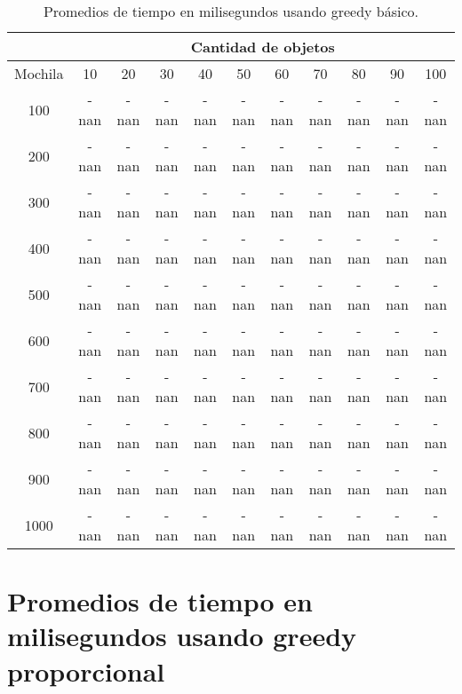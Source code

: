 \documentclass[a4paper]{article}
\begin{document}
\begin{table}[H]
\centering
\relax
\resizebox{\textwidth}{!} {%
\begin{tabular}{|c|c|c|c|c|c|c|c|c|c|c|}
\cline{2-11}
 \multicolumn{1}{c}{} & \multicolumn{10}{|c|}{\textbf{Cantidad de objetos}} \\
\hline
Mochila & 10 & 20 & 30 & 40 & 50 & 60 & 70 & 80 & 90 & 100 \\
\hline
\hline
100 & -nan & -nan & -nan & -nan & -nan & -nan & -nan & -nan & -nan & -nan \\
\hline
\hline
200 & -nan & -nan & -nan & -nan & -nan & -nan & -nan & -nan & -nan & -nan \\
\hline
\hline
300 & -nan & -nan & -nan & -nan & -nan & -nan & -nan & -nan & -nan & -nan \\
\hline
\hline
400 & -nan & -nan & -nan & -nan & -nan & -nan & -nan & -nan & -nan & -nan \\
\hline
\hline
500 & -nan & -nan & -nan & -nan & -nan & -nan & -nan & -nan & -nan & -nan \\
\hline
\hline
600 & -nan & -nan & -nan & -nan & -nan & -nan & -nan & -nan & -nan & -nan \\
\hline
\hline
700 & -nan & -nan & -nan & -nan & -nan & -nan & -nan & -nan & -nan & -nan \\
\hline
\hline
800 & -nan & -nan & -nan & -nan & -nan & -nan & -nan & -nan & -nan & -nan \\
\hline
\hline
900 & -nan & -nan & -nan & -nan & -nan & -nan & -nan & -nan & -nan & -nan \\
\hline
\hline
1000 & -nan & -nan & -nan & -nan & -nan & -nan & -nan & -nan & -nan & -nan \\
\hline
\end{tabular}%
}
\caption{Promedios de tiempo en milisegundos usando greedy básico.}
\end{table}
\section{Promedios de tiempo en milisegundos usando greedy proporcional}
\end{document}
